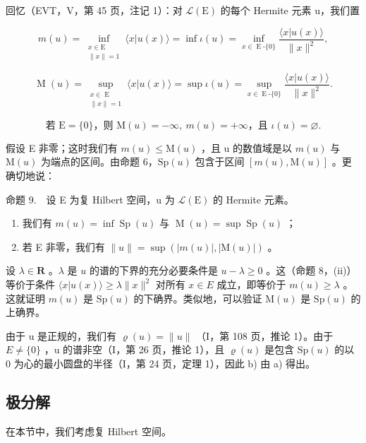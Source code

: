 回忆（EVT，V，第 45 页，注记 1）：对 \(\mathcal{L}(\mathrm{E})\) 的每个 Hermite 元素 u，我们置

\[
m(u) = \inf_{\substack{x\in \mathrm{E}\\ \| x\| = 1}}\langle x|u(x)\rangle = \inf \iota (u) = \inf_{x\in \operatorname{E}\text{-}\{0\}}\frac{\langle x|u(x)\rangle}{\|x\|^ {2}},
\]

\[
\operatorname{M}(u) = \sup_{\substack{x\in \operatorname{E}\\ \| x\| = 1}}\langle x|u(x)\rangle = \sup \iota (u) = \sup_{x\in \operatorname{E}\text{-}\{0\}}\frac{\langle x|u(x)\rangle}{\|x\|^ {2}}.
\]

\[
\text{若 } \mathrm{E} = \{0\}\text{，则 } \mathrm{M}(u) = -\infty,\ m(u) = +\infty\text{，且 } \iota(u) = \varnothing.
\]

假设 E 非零；这时我们有 \(m(u) \leqslant \mathrm{M}(u)\) ，且 u 的数值域是以 \(m(u)\) 与 \(\mathrm{M}(u)\) 为端点的区间。由命题 6，\(\mathrm{Sp}(u)\) 包含于区间 \([m(u), \mathrm{M}(u)]\) 。更确切地说：

命题 9.　设 E 为复 Hilbert 空间，u 为 \(\mathcal{L}(\mathrm{E})\) 的 Hermite 元素。

\begin{enumerate}
\def\labelenumi{\alph{enumi})}
\item
  我们有 \(m(u) = \inf \operatorname{Sp}(u)\) 与 \(\operatorname{M}(u) = \sup \operatorname{Sp}(u)\) ；
\item
  若 E 非零，我们有 \(\|u\|=\sup(|m(u)|,|\mathrm{M}(u)|)\) 。
\end{enumerate}

设 \(\lambda \in \mathbf{R}\) 。\(\lambda\) 是 \(u\) 的谱的下界的充分必要条件是 \(u - \lambda \geqslant 0\) 。这（命题 8，(ii)）等价于条件 \(\langle x|u(x)\rangle \geqslant \lambda \|x\|^2\) 对所有 \(x \in E\) 成立，即等价于 \(m(u) \geqslant \lambda\) 。这就证明 \(m(u)\) 是 \(\mathrm{Sp}(u)\) 的下确界。类似地，可以验证 \(\mathrm{M}(u)\) 是 \(\mathrm{Sp}(u)\) 的上确界。

由于 u 是正规的，我们有 \(\varrho(u)=\|u\|\) （I，第 108 页，推论 1）。由于 \(E\neq\{0\}\) ，u 的谱非空（I，第 26 页，推论 1），且 \(\varrho(u)\) 是包含 \(\mathrm{Sp}(u)\) 的以 0 为心的最小圆盘的半径（I，第 24 页，定理 1），因此 b) 由 a) 得出。

\subsection{极分解}

在本节中，我们考虑复 Hilbert 空间。

